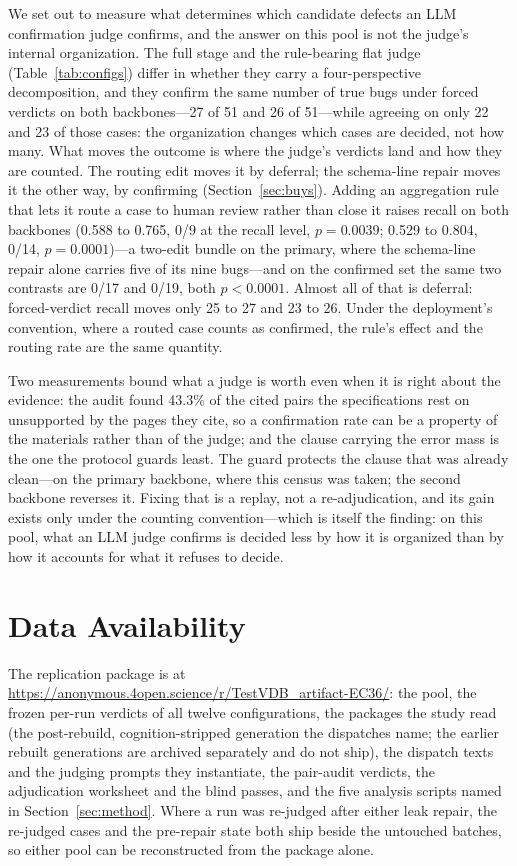 \documentclass[acmsmall,screen,review,anonymous]{acmart}
\begin{document}
We set out to measure what determines which candidate defects an LLM confirmation judge confirms,
and the answer on this pool is not the judge's internal organization. The full stage and the
rule-bearing flat judge (Table~\ref{tab:configs}) differ in whether they carry a four-perspective
decomposition, and they confirm the same number of true bugs under
forced verdicts on both backbones---27 of 51 and 26 of 51---while agreeing on only 22 and 23 of those
cases: the organization changes which cases are decided, not how many. What moves the outcome is
where the judge's verdicts land and how they are counted. The routing edit moves it by deferral; the
schema-line repair moves it the other way, by confirming (Section~\ref{sec:buys}). Adding an aggregation rule that lets it route a case to human
review rather than close it raises recall on both backbones (0.588 to 0.765, 0/9 at the recall level,
$p{=}0.0039$; 0.529 to 0.804, 0/14, $p{=}0.0001$)---a two-edit bundle on the primary, where the
schema-line repair alone carries five of its nine bugs---and on the confirmed set the same two contrasts
are 0/17 and 0/19, both $p{<}0.0001$. Almost all of that is deferral: forced-verdict recall moves
only 25 to 27 and 23 to 26. Under the deployment's convention, where a routed case counts as
confirmed, the rule's effect and the routing rate are the same quantity.

Two measurements bound what a judge is worth even when it is right about the evidence: the audit
found 43.3\% of the cited pairs the specifications rest on unsupported by the pages they cite, so a
confirmation rate can be a property of the materials rather than of the judge; and the clause
carrying the error mass is the one the protocol guards least. The guard protects the clause that was
already clean---on the primary backbone, where this census was taken; the second backbone reverses
it. Fixing that is a replay, not a re-adjudication, and its gain exists only under the counting
convention---which is itself the finding: on this pool, what an LLM judge confirms is decided less by
how it is organized than by how it accounts for what it refuses to decide.

\section*{Data Availability}

The replication package is at \url{https://anonymous.4open.science/r/TestVDB_artifact-EC36/}: the
pool, the frozen per-run verdicts of all twelve configurations, the packages the study read (the
post-rebuild, cognition-stripped generation the dispatches name; the earlier rebuilt generations are
archived separately and do not ship), the dispatch texts and the judging prompts they instantiate,
the pair-audit verdicts, the adjudication worksheet and the blind passes, and the five analysis
scripts named in Section~\ref{sec:method}.
Where a run was re-judged after either leak repair, the re-judged cases and the pre-repair state both
ship beside the untouched batches, so either pool can be reconstructed from the package alone.



\end{document}

